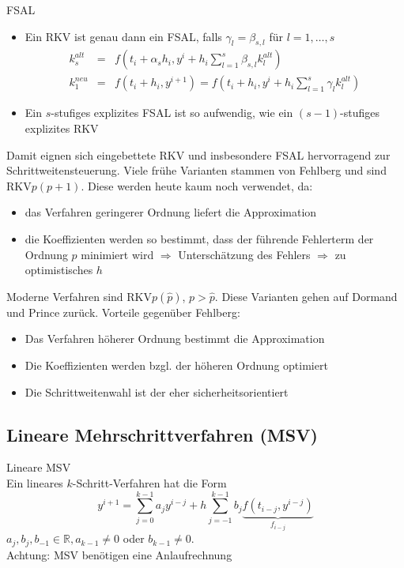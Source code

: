 \begin{remark}
	FSAL
	\begin{itemize}
		\item Ein RKV ist genau dann ein FSAL, falls $\gamma_{l}=\beta_{s,l}$ für $l=1,\ldots,s$
		\begin{eqnarray*}
			k_{s}^{alt} &=& f(t_{i}+\alpha_{s}h_{i},y^{i}+h_{i}\sum_{l=1}^{s}\beta_{s,l}k_{l}^{alt})\\
			k_{1}^{neu} &=&f(t_{i}+h_{i},y^{i+1})=f(t_{i}+h_{i},y^{i}+h_{i}\sum_{l=1}^{s}\gamma_{l}k_{l}^{alt})
		\end{eqnarray*}
		\item Ein $s$-stufiges explizites FSAL ist so aufwendig, wie ein $(s-1)$-stufiges explizites RKV
	\end{itemize}
	
	Damit eignen sich eingebettete RKV und insbesondere FSAL hervorragend zur Schrittweitensteuerung.
	Viele frühe Varianten stammen von Fehlberg und sind RKV$p(p+1)$. Diese werden heute kaum noch verwendet, da:
	\begin{itemize}
		\item das Verfahren geringerer Ordnung liefert die Approximation
		\item die Koeffizienten werden so bestimmt, dass der führende Fehlerterm der Ordnung $p$ minimiert wird $\Rightarrow$ Unterschätzung
		des Fehlers $\Rightarrow$ zu optimistisches $h$
	\end{itemize}
	Moderne Verfahren sind RKV$p(\hat p)$, $p>\hat p$. Diese Varianten gehen auf Dormand und Prince zurück. Vorteile gegenüber Fehlberg:
	\begin{itemize}
		\item Das Verfahren höherer Ordnung bestimmt die Approximation
		\item Die Koeffizienten werden bzgl. der höheren Ordnung optimiert
		\item Die Schrittweitenwahl ist der eher sicherheitsorientiert
	\end{itemize}
\end{remark}

\subsection{Lineare Mehrschrittverfahren (MSV)}
\begin{definition}
	[Definition IV.7] Lineare MSV
	\\
	Ein lineares $k$-Schritt-Verfahren hat die Form
	$$y^{i+1}=\sum_{j=0}^{k-1}a_{j}y^{i-j} + h\sum_{j=-1}^{k-1}b_{j}\underbrace{f(t_{i-j},y^{i-j})}_{f_{i-j}}$$
	$a_{j},b_{j},b_{-1}\in \mathbb{R},a_{k-1}\not = 0$ oder $b_{k-1}\not = 0$.
	\\
	Achtung: MSV benötigen eine Anlaufrechnung
\end{definition}

